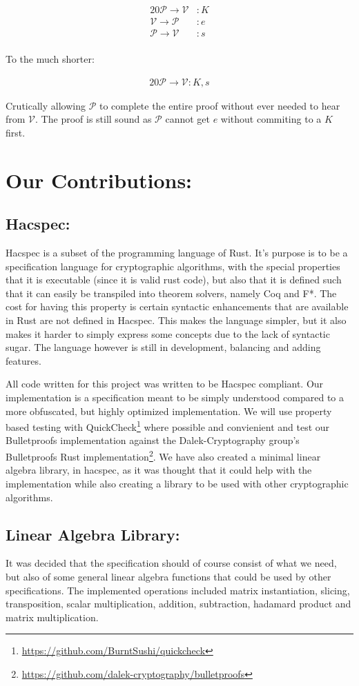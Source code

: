 \documentclass{article}
\newcommand{\eq}[1]{\begin{alignat*}{20}#1\end{alignat*}}
\newcommand{\V}{\mathcal{V}}
\renewcommand{\P}{\mathcal{P}}
\begin{document}
\eq{
	\P \rightarrow \V &: K \\
	\V \rightarrow \P &: e \\
	\P \rightarrow \V &: s \\
}

To the much shorter:

\eq{
	\P \rightarrow \V: K, s
}

Crutically allowing $\P$ to complete the entire proof without ever needed to hear from $\V$. The proof is still sound as $\P$ cannot get $e$ without commiting to a $K$ first.

\section{Our Contributions:}

\subsection{Hacspec:} \label{Hacspec}

Hacspec is a subset of the programming language of Rust. It's purpose is
to be a specification language for cryptographic algorithms, with the
special properties that it is executable (since it is valid rust code),
but also that it is defined such that it can easily be transpiled
into theorem solvers, namely Coq and F*. The cost for having this
property is certain syntactic enhancements that are available in Rust
are not defined in Hacspec. This makes the language simpler, but it
also makes it harder to simply express some concepts due to the lack
of syntactic sugar. The language however is still in development,
balancing and adding features.

All code written for this project was written to be Hacspec
compliant. Our implementation is a specification meant to be
simply understood compared to a more obfuscated, but highly
optimized implementation. We will use property based testing with
QuickCheck\footnote{\url{https://github.com/BurntSushi/quickcheck}}
where possible and convienient and test our Bulletproofs
implementation against the Dalek-Cryptography group's Bulletproofs Rust
implementation\footnote{\url{https://github.com/dalek-cryptography/bulletproofs}}.
We have also created a minimal linear algebra library,
in hacspec, as it was thought that it could help with the
implementation while also creating a library to be used with
other cryptographic algorithms.

\subsection{Linear Algebra Library:}
It was decided that the specification should of course consist of what
we need, but also of some general linear algebra functions that could
be used by other specifications. The implemented operations included
matrix instantiation, slicing, transposition, scalar multiplication,
addition, subtraction, hadamard product and matrix multiplication.
\end{document}
